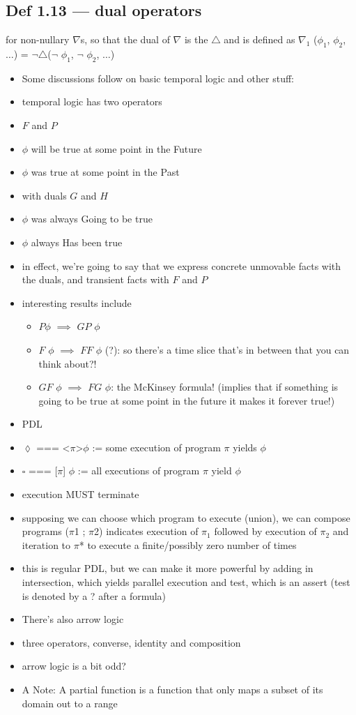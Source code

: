 \documentclass[10pt, a4paper, twoside]{article}
\begin{document}
\subsection{Def 1.13 --- dual operators}
for non-nullary $\nabla$s, so that the dual of $\nabla$ is the $\bigtriangleup$ and is defined as $\nabla_1$ ($\phi_1$, $\phi_2$, $\ldots$) = $\neg \bigtriangleup$($\neg$ $\phi_1$, $\neg$ $\phi_2$, $\ldots$)
\begin{itemize}
  \item Some discussions follow on basic temporal logic and other stuff:
  \item temporal logic has two operators
  \item $F$ and $P$
  \item $\phi$ will be true at some point in the Future
  \item $\phi$ was true at some point in the Past
  \item with duals $G$ and $H$
  \item $\phi$ was always Going to be true
  \item $\phi$ always Has been true
  \item in effect, we’re going to say that we express concrete unmovable facts with the duals, and transient facts with $F$ and $P$
  \item interesting results include
  \begin{itemize}
    \item $P$$\phi$ $\implies$ $G P$ $\phi$
    \item $F$ $\phi$ $\implies$ $F F$ $\phi$ (?): so there’s a time slice that’s in between that you can think about?!
    \item $G F$ $\phi$ $\implies$ $F G$ $\phi$: the McKinsey formula! (implies that if something is going to be true at some point in the future it makes it forever true!)
  \end{itemize}
  \item PDL
  \item $\lozenge$ === <$\pi$>$\phi$ := some execution of program $\pi$ yields $\phi$
  \item $\square$ === [$\pi$] $\phi$ := all executions of program $\pi$ yield $\phi$
  \item execution MUST terminate
  \item supposing we can choose which program to execute (union), we can compose
  programs ($\pi$1 ; $\pi$2) indicates execution of $\pi_1$ followed by execution of $\pi_2$
  and iteration to $\pi$* to execute a finite/possibly zero number of times
  \item this is regular PDL, but we can make it more powerful by adding in intersection, which yields parallel execution and test, which is an assert (test is denoted by a ? after a formula)
  \item There’s also arrow logic
  \item three operators, converse, identity and composition
  \item arrow logic is a bit odd?
  \item A Note: A partial function is a function that only maps a subset of its domain out to a range
\end{itemize}
\end{document}
